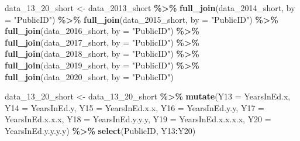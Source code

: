 \documentclass[
]{article}
\newenvironment{Shaded}{\begin{snugshade}}{\end{snugshade}}
\newcommand{\DataTypeTok}[1]{\textcolor[rgb]{0.13,0.29,0.53}{#1}}
\newcommand{\DecValTok}[1]{\textcolor[rgb]{0.00,0.00,0.81}{#1}}
\newcommand{\KeywordTok}[1]{\textcolor[rgb]{0.13,0.29,0.53}{\textbf{#1}}}
\newcommand{\NormalTok}[1]{#1}
\newcommand{\OperatorTok}[1]{\textcolor[rgb]{0.81,0.36,0.00}{\textbf{#1}}}
\newcommand{\StringTok}[1]{\textcolor[rgb]{0.31,0.60,0.02}{#1}}
\begin{document}
\begin{Shaded}
\begin{Highlighting}[]
\NormalTok{data\_}\DecValTok{13}\NormalTok{\_}\DecValTok{20}\NormalTok{\_short \textless{}{-}}\StringTok{ }\NormalTok{data\_}\DecValTok{2013}\NormalTok{\_short }\OperatorTok{\%\textgreater{}\%}
\StringTok{  }\KeywordTok{full\_join}\NormalTok{(data\_}\DecValTok{2014}\NormalTok{\_short, }\DataTypeTok{by =} \StringTok{"PublicID"}\NormalTok{) }\OperatorTok{\%\textgreater{}\%}
\StringTok{  }\KeywordTok{full\_join}\NormalTok{(data\_}\DecValTok{2015}\NormalTok{\_short, }\DataTypeTok{by =} \StringTok{"PublicID"}\NormalTok{) }\OperatorTok{\%\textgreater{}\%}
\StringTok{  }\KeywordTok{full\_join}\NormalTok{(data\_}\DecValTok{2016}\NormalTok{\_short, }\DataTypeTok{by =} \StringTok{"PublicID"}\NormalTok{) }\OperatorTok{\%\textgreater{}\%}
\StringTok{  }\KeywordTok{full\_join}\NormalTok{(data\_}\DecValTok{2017}\NormalTok{\_short, }\DataTypeTok{by =} \StringTok{"PublicID"}\NormalTok{) }\OperatorTok{\%\textgreater{}\%}
\StringTok{  }\KeywordTok{full\_join}\NormalTok{(data\_}\DecValTok{2018}\NormalTok{\_short, }\DataTypeTok{by =} \StringTok{"PublicID"}\NormalTok{) }\OperatorTok{\%\textgreater{}\%}
\StringTok{  }\KeywordTok{full\_join}\NormalTok{(data\_}\DecValTok{2019}\NormalTok{\_short, }\DataTypeTok{by =} \StringTok{"PublicID"}\NormalTok{) }\OperatorTok{\%\textgreater{}\%}
\StringTok{  }\KeywordTok{full\_join}\NormalTok{(data\_}\DecValTok{2020}\NormalTok{\_short, }\DataTypeTok{by =} \StringTok{"PublicID"}\NormalTok{)}
\end{Highlighting}
\end{Shaded}

\begin{Shaded}
\begin{Highlighting}[]
\NormalTok{data\_}\DecValTok{13}\NormalTok{\_}\DecValTok{20}\NormalTok{\_short \textless{}{-}}\StringTok{ }\NormalTok{data\_}\DecValTok{13}\NormalTok{\_}\DecValTok{20}\NormalTok{\_short }\OperatorTok{\%\textgreater{}\%}
\StringTok{  }\KeywordTok{mutate}\NormalTok{(}\DataTypeTok{Y13 =}\NormalTok{ YearsInEd.x, }\DataTypeTok{Y14 =}\NormalTok{ YearsInEd.y, }\DataTypeTok{Y15 =}\NormalTok{ YearsInEd.x.x,}
         \DataTypeTok{Y16 =}\NormalTok{ YearsInEd.y.y, }\DataTypeTok{Y17 =}\NormalTok{ YearsInEd.x.x.x, }\DataTypeTok{Y18 =}\NormalTok{ YearsInEd.y.y.y, }
         \DataTypeTok{Y19 =}\NormalTok{ YearsInEd.x.x.x.x, }\DataTypeTok{Y20 =}\NormalTok{ YearsInEd.y.y.y.y) }\OperatorTok{\%\textgreater{}\%}
\StringTok{  }\KeywordTok{select}\NormalTok{(PublicID, Y13}\OperatorTok{:}\NormalTok{Y20)}
\end{Highlighting}
\end{Shaded}
\end{document}
